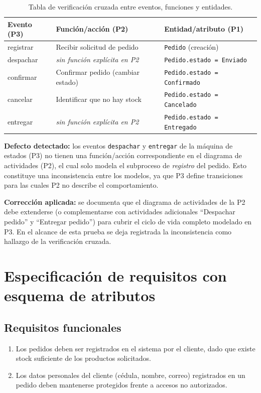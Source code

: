 \documentclass[11pt,a4paper]{article}
\begin{document}
\begin{table}[H]
\centering
\begin{tabular}{L{3cm} L{5.5cm} L{4.5cm}}
\toprule
\textbf{Evento (P3)} & \textbf{Función/acción (P2)} & \textbf{Entidad/atributo (P1)} \\
\midrule
registrar  & Recibir solicitud de pedido               & \texttt{Pedido} (creación) \\
despachar  & \emph{sin función explícita en P2}        & \texttt{Pedido.estado = Enviado} \\
confirmar  & Confirmar pedido (cambiar estado)         & \texttt{Pedido.estado = Confirmado} \\
cancelar   & Identificar que no hay stock              & \texttt{Pedido.estado = Cancelado} \\
entregar   & \emph{sin función explícita en P2}         & \texttt{Pedido.estado = Entregado} \\
\bottomrule
\end{tabular}
\caption{Tabla de verificación cruzada entre eventos, funciones y entidades.}
\end{table}

\textbf{Defecto detectado:} los eventos \texttt{despachar} y \texttt{entregar} de la máquina de
estados (P3) no tienen una función/acción correspondiente en el diagrama de actividades (P2), el
cual solo modela el subproceso de \emph{registro} del pedido. Esto constituye una inconsistencia
entre los modelos, ya que P3 define transiciones para las cuales P2 no describe el comportamiento.

\textbf{Corrección aplicada:} se documenta que el diagrama de actividades de la P2 debe extenderse
(o complementarse con actividades adicionales ``Despachar pedido'' y ``Entregar pedido'') para
cubrir el ciclo de vida completo modelado en P3. En el alcance de esta prueba se deja registrada la
inconsistencia como hallazgo de la verificación cruzada.

\FloatBarrier

\section{Especificación de requisitos con esquema de atributos}

\subsection*{Requisitos funcionales}
\begin{enumerate}[label=\textbf{RF-\arabic*}]
    \item Los pedidos deben ser registrados en el sistema por el cliente, dado que existe stock suficiente de los productos solicitados.
    \item Los datos personales del cliente (cédula, nombre, correo) registrados en un pedido deben mantenerse protegidos frente a accesos no autorizados.
\end{enumerate}
\end{document}
